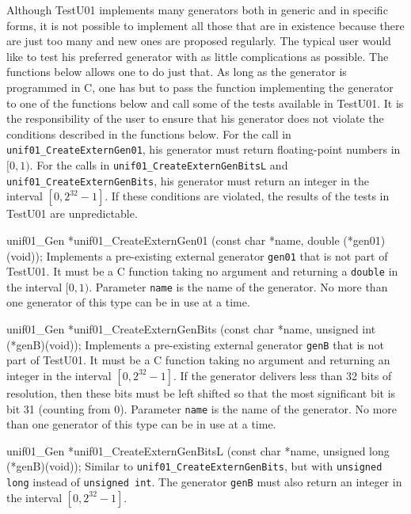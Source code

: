 
Although  TestU01 implements many generators both in generic and in
specific forms, it is not possible to implement all those that are in
existence because there are just too many and new ones are proposed 
regularly. The typical user would like to test his preferred generator
with as little complications as possible. The functions below allows one 
to do just that. As long as the generator is programmed in C, 
one has but to pass  the function implementing the generator to one of the
functions below and call some of the tests available in TestU01.
It is the responsibility of the user to ensure that his generator does not
violate the conditions described in the functions below. For the
call in {\tt unif01\_CreateExternGen01}, his generator must return
floating-point numbers in $[0, 1)$. For the calls in
 {\tt unif01\_CreateExternGenBitsL} and  {\tt unif01\_CreateExternGenBits},
 his generator must return an integer in the interval $[0, 2^{32} - 1]$.
If these conditions are violated, the results of the tests in TestU01 are
unpredictable. %
\code


unif01_Gen *unif01_CreateExternGen01 (const char *name, double (*gen01)(void));
\endcode
\tab Implements a pre-existing external generator {\tt gen01} that is
  not part of TestU01. \label{externgen}
 It must be a C function taking no argument and returning a {\tt double}
 in the interval $[0, 1)$. Parameter {\tt name} is the name of the generator.
 No more than one generator of this type can be in use at a  time. 
\endtab
\code


unif01_Gen *unif01_CreateExternGenBits (const char *name,
                                        unsigned int (*genB)(void));
\endcode
\tab Implements a pre-existing external generator {\tt genB} that is not part
 of TestU01. It must be a C function taking no argument and returning
 an integer in the interval $[0, 2^{32} - 1]$.
 If the generator delivers less than 32 bits of resolution, then these 
 bits must be left shifted so that the most significant bit is bit 31
 (counting from 0). Parameter {\tt name} is the name of the generator.
 No more than one generator of this type can be in use at a  time. 
 \endtab
\code


unif01_Gen *unif01_CreateExternGenBitsL (const char *name,
                                         unsigned long (*genB)(void));
\endcode
\tab Similar to {\tt unif01\_CreateExternGenBits}, but with
{\tt unsigned long} instead of {\tt unsigned int}. The generator 
{\tt genB} must also return  an integer in the interval $[0, 2^{32} - 1]$.
 \endtab
\code


